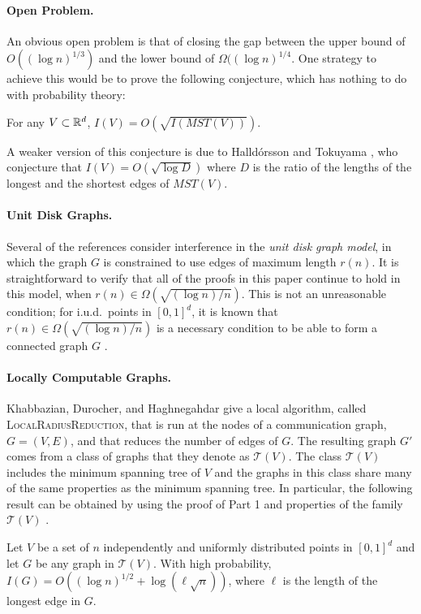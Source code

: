 \documentclass{cccg12}
\newcommand{\mst}{\mathit{MST}}
\begin{document}
\paragraph{Open Problem.}
An obvious open problem is that of closing the gap between the upper bound
of $O((\log n)^{1/3})$ and the lower bound of $\Omega((\log n)^{1/4}$.
One strategy to achieve this would be to prove the following conjecture,
which has nothing to do with probability theory:
\begin{conj}
  For any $V\subset\mathbb{R}^d$, $I(V) = O(\sqrt{I(\mst(V))})$.
\end{conj}
A weaker version of this conjecture is due to Halld\'orsson and Tokuyama
\cite{ht08}, who conjecture that $I(V)=O(\sqrt{\log D})$ where $D$ is the
ratio of the lengths of the longest and the shortest edges of $\mst(V)$.

\paragraph{Unit Disk Graphs.}
Several of the references consider interference in the \emph{unit
disk graph model}, in which the graph $G$ is constrained to use
edges of maximum length $r(n)$.  It is straightforward to verify
that all of the proofs in this paper continue to hold in this model,
when $r(n)\in\Omega(\sqrt{(\log n)/n})$.  This is not an unreasonable
condition; for i.u.d.\ points in $[0,1]^d$, it is known that
$r(n)\in\Omega(\sqrt{(\log n)/n})$ is a necessary condition to be able to
form a connected graph $G$ \cite{p97}.

\paragraph{Locally Computable Graphs.}
Khabbazian, Durocher, and Haghnegahdar \cite{kdh11} give a local
algorithm, called \textsc{LocalRadiusReduction}, that is run at the nodes
of a communication graph, $G=(V,E)$, and that reduces the number of edges
of $G$.  The resulting graph $G'$ comes from a class of graphs that
they denote as $\mathcal{T}(V)$.  The class $\mathcal{T}(V)$ includes
the minimum spanning tree of $V$ and the graphs in this class share
many of the same properties as the minimum spanning tree.  In particular,
the following result can be obtained by using the proof of  Part 1 and properties of the family $\mathcal{T}(V)$ \cite[Theorem~3]{kdh11}.

\setcounter{thm}{2}
\begin{thm}
  Let $V$ be a set of $n$ independently and uniformly distributed
  points in $[0,1]^d$ and let $G$ be any graph in $\mathcal{T}(V)$.
  With high probability, $I(G)=O((\log n)^{1/2}+\log (\ell\sqrt{n}))$,
  where $\ell$ is the length of the longest edge in $G$.
\end{thm}
\end{document}
